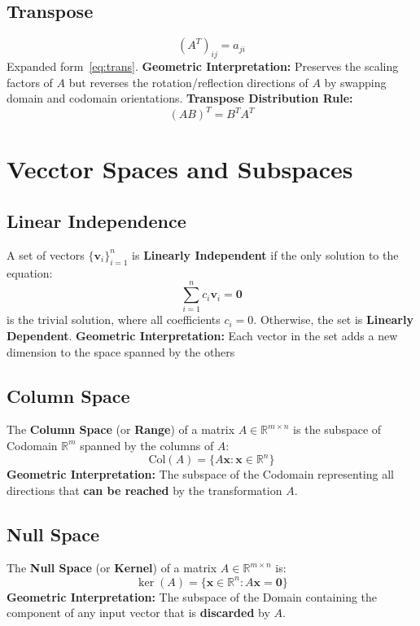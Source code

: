 \documentclass{article}
\begin{document}
\subsection{Transpose}
\[
    (A^T)_{ij} = a_{ji}
\]
Expanded form~\ref{eq:trans}.
\newline
\textbf{Geometric Interpretation:} Preserves the scaling factors of $A$ but reverses the rotation/reflection directions of $A$ by swapping domain and codomain orientations.
\newline
\textbf{Transpose Distribution Rule:}
\[
    (AB)^T = B^T A^T
\]


\newpage
\section{Vecctor Spaces and Subspaces}

\subsection{Linear Independence}
A set of vectors $\{\mathbf{v}_i\}_{i=1}^n$ is \textbf{Linearly Independent} if the only solution to the equation:
\[
    \sum_{i=1}^{n} c_i \mathbf{v}_i = \mathbf{0}
\]
is the trivial solution, where all coefficients $c_i = 0$. Otherwise, the set is \textbf{Linearly Dependent}.
\newline
\textbf{Geometric Interpretation:} Each vector in the set adds a new dimension to the space spanned by the others

\subsection{Column Space}
The \textbf{Column Space} (or \textbf{Range}) of a matrix $A \in \mathbb{R}^{m \times n}$ is the subspace of Codomain $\mathbb{R}^m$ spanned by the columns of $A$:
\[
    \text{Col}(A) = \{ A\mathbf{x} : \mathbf{x} \in \mathbb{R}^n \}
\]
\textbf{Geometric Interpretation:} The subspace of the Codomain representing all directions that \textbf{can be reached} by the transformation $A$.

\subsection{Null Space}
The \textbf{Null Space} (or \textbf{Kernel}) of a matrix $A \in \mathbb{R}^{m \times n}$ is:
\[
    \ker(A) = \{ \mathbf{x} \in \mathbb{R}^n : A\mathbf{x} = \mathbf{0} \}
\]
\textbf{Geometric Interpretation:} The subspace of the Domain containing the component of any input vector that is \textbf{discarded} by $A$.
\end{document}
